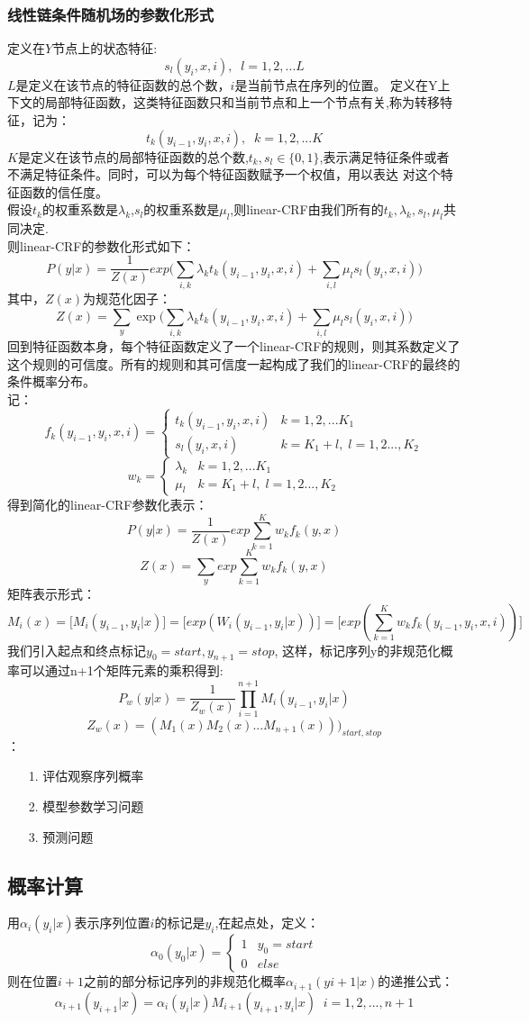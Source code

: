 \documentclass[UTF8]{article}%
\begin{document}
	\subsubsection{线性链条件随机场的参数化形式}
	定义在$Y$节点上的状态特征:
	$$s_l(y_i, x,i),\;\; l =1,2,...L$$
	$L$是定义在该节点的特征函数的总个数，$i$是当前节点在序列的位置。
	定义在Y上下文的局部特征函数，这类特征函数只和当前节点和上一个节点有关,称为转移特征，记为：
	$$t_k(y_{i-1},y_i, x,i),\;\; k =1,2,...K$$
	$K$是定义在该节点的局部特征函数的总个数,$t_k,s_l\in\{0,1\}$,表示满足特征条件或者不满足特征条件。同时，可以为每个特征函数赋予一个权值，用以表达 对这个特征函数的信任度。\\
	假设$t_k$的权重系数是$\lambda_k$,$s_l$的权重系数是$\mu_l$,则linear-CRF由我们所有的$t_k,\lambda_k,s_l,\mu_l$共同决定.\\
	则linear-CRF的参数化形式如下：
	$$P(y|x) = \frac{1}{Z(x)}exp\Big(\sum\limits_{i,k} \lambda_kt_k(y_{i-1},y_i, x,i) +\sum\limits_{i,l}\mu_ls_l(y_i, x,i)\Big)$$
	其中，$Z(x)$为规范化因子：
	$$ Z(x) =\sum\limits_{y} \exp\Big(\sum\limits_{i,k} \lambda_kt_k(y_{i-1},y_i, x,i) +\sum\limits_{i,l}\mu_ls_l(y_i, x,i)\Big)$$
	回到特征函数本身，每个特征函数定义了一个linear-CRF的规则，则其系数定义了这个规则的可信度。所有的规则和其可信度一起构成了我们的linear-CRF的最终的条件概率分布。
	\\记：\\
	$$f_k(y_{i-1},y_i, x,i)= \begin{cases} t_k(y_{i-1},y_i, x,i) & {k=1,2,...K_1}\\ s_l(y_i, x,i)& {k=K_1+l,\; l=1,2...,K_2} \end{cases}$$
	$$w_k= \begin{cases} \lambda_k & {k=1,2,...K_1}\\ \mu_l & {k=K_1+l,\; l=1,2...,K_2} \end{cases}$$
	得到简化的linear-CRF参数化表示：
	$$P(y|x) =  \frac{1}{Z(x)}exp\sum\limits_{k=1}^Kw_kf_k(y,x)$$
	$$Z(x) =\sum\limits_{y}exp\sum\limits_{k=1}^Kw_kf_k(y,x)$$
	矩阵表示形式：
	$$M_i(x) = \Big[ M_i(y_{i-1},y_i |x)\Big] =  \Big[  exp(W_i(y_{i-1},y_i |x))\Big] = \Big[  exp(\sum\limits_{k=1}^Kw_kf_k(y_{i-1},y_i, x,i))\Big]$$
	我们引入起点和终点标记$y_0 =start, y_{n+1} = stop$, 这样，标记序列y的非规范化概率可以通过n+1个矩阵元素的乘积得到:
	$$P_w(y|x) =  \frac{1}{Z_w(x)}\prod_{i=1}^{n+1}M_i(y_{i-1},y_i |x)$$
	$$Z_w(x)=(M_1(x)M_2(x)...M_{n+1}(x)))_{start,stop}$$
	\newpage
	：
		\begin{enumerate}		
		\item[1.]评估观察序列概率
		\item[2.]模型参数学习问题
		\item[3.]预测问题
		\end{enumerate}
	\subsection{概率计算}
	用$\alpha_i(y_i|x)$表示序列位置$i$的标记是$y_i$,在起点处，定义：
	$$\alpha_0(y_0|x)= \begin{cases} 1 & {y_0 =start}\\ 0 & {else} \end{cases}$$
	则在位置$i+1$之前的部分标记序列的非规范化概率$\alpha_{i+1}(yi+1|x)$的递推公式：
	$$\alpha_{i+1}(y_{i+1}|x) = \alpha_i(y_i|x)M_{i+1}(y_{i+1},y_i|x) \;\; i=1,2,...,n+1$$
\end{document}
